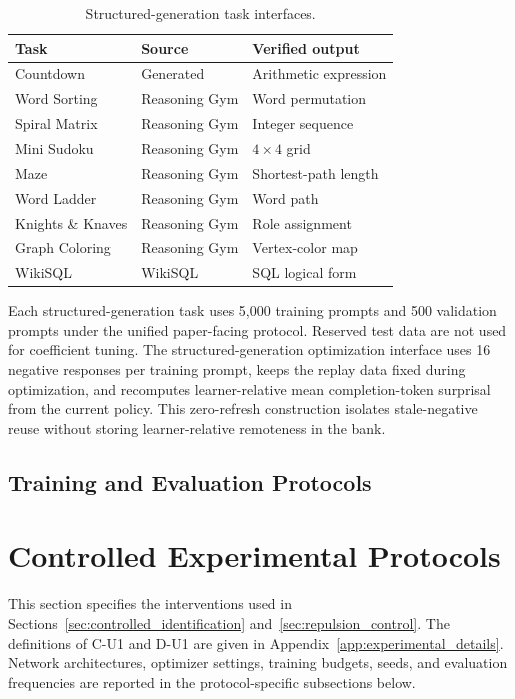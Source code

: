 \documentclass{article}
\theoremstyle{plain}
\theoremstyle{definition}
\theoremstyle{remark}
\begin{document}
\begin{table}[t]
\centering
\caption{Structured-generation task interfaces.}
\label{tab:structured_generation_tasks}
\small
\setlength{\tabcolsep}{3.2pt}
\begin{tabular*}{\columnwidth}{@{\extracolsep{\fill}}lll}
\toprule
Task & Source & Verified output \\
\midrule
Countdown & Generated & Arithmetic expression \\
Word Sorting & Reasoning Gym & Word permutation \\
Spiral Matrix & Reasoning Gym & Integer sequence \\
Mini Sudoku & Reasoning Gym & \(4\times4\) grid \\
Maze & Reasoning Gym & Shortest-path length \\
Word Ladder & Reasoning Gym & Word path \\
Knights \& Knaves & Reasoning Gym & Role assignment \\
Graph Coloring & Reasoning Gym & Vertex-color map \\
WikiSQL & WikiSQL & SQL logical form \\
\bottomrule
\end{tabular*}
\end{table}

Each structured-generation task uses 5,000 training prompts and
500 validation prompts under the unified paper-facing protocol. Reserved test
data are not used for coefficient tuning. The structured-generation optimization
interface uses 16 negative responses per training prompt, keeps the replay data
fixed during optimization, and recomputes learner-relative mean completion-token
surprisal from the current policy. This zero-refresh construction isolates
stale-negative reuse without storing learner-relative remoteness in the bank.

\subsection{Training and Evaluation Protocols}

\section{Controlled Experimental Protocols}
\label{app:controlled_protocols}

This section specifies the interventions used in
Sections~\ref{sec:controlled_identification}
and~\ref{sec:repulsion_control}. The definitions of C-U1 and D-U1 are given in
Appendix~\ref{app:experimental_details}. Network architectures,
optimizer settings, training budgets, seeds, and evaluation frequencies
are reported in the protocol-specific subsections below.
\end{document}
